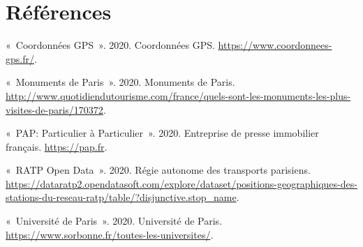 \documentclass[french,]{article}
\begin{document}
\hypertarget{ruxe9fuxe9rences}{%
\section*{Références}\label{ruxe9fuxe9rences}}

\hypertarget{refs}{}
\leavevmode\hypertarget{ref-CoordonneeGPS}{}%
«~Coordonnées GPS~». 2020. Coordonnées GPS.
\url{https://www.coordonnees-gps.fr/}.

\leavevmode\hypertarget{ref-Monuments}{}%
«~Monuments de Paris~». 2020. Monuments de Paris.
\url{http://www.quotidiendutourisme.com/france/quels-sont-les-monuments-les-plus-visites-de-paris/170372}.

\leavevmode\hypertarget{ref-PAP}{}%
«~PAP: Particulier à Particulier~». 2020. Entreprise de presse
immobilier français. \url{https://pap.fr}.

\leavevmode\hypertarget{ref-RATP}{}%
«~RATP Open Data~». 2020. Régie autonome des transports parisiens.
\url{https://dataratp2.opendatasoft.com/explore/dataset/positions-geographiques-des-stations-du-reseau-ratp/table/?disjunctive.stop_name}.

\leavevmode\hypertarget{ref-UDP}{}%
«~Université de Paris~». 2020. Université de Paris.
\url{https://www.sorbonne.fr/toutes-les-universites/}.
\end{document}
